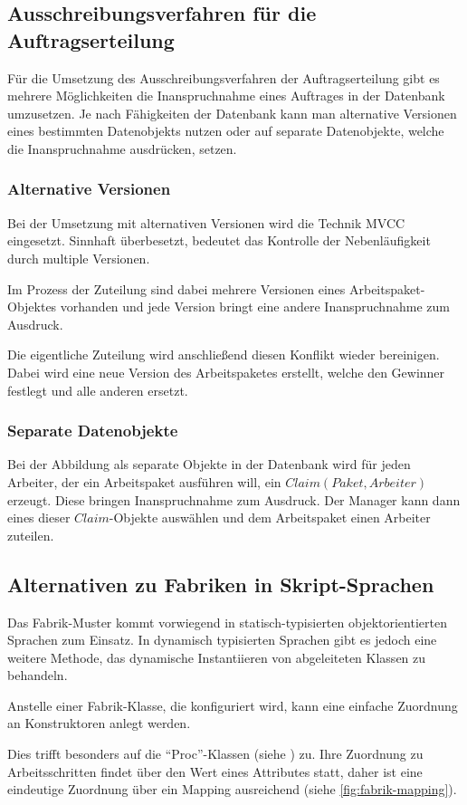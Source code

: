 \subsection{Ausschreibungsverfahren für die Auftragserteilung}
\label{sec:verfahren:erteilung}

Für die Umsetzung des Ausschreibungsverfahren der Auftragserteilung gibt es
mehrere Möglichkeiten die Inanspruchnahme eines Auftrages in
der Datenbank umzusetzen. Je nach Fähigkeiten der Datenbank kann man 
alternative Versionen eines bestimmten Datenobjekts nutzen
oder auf separate Datenobjekte, welche die Inanspruchnahme ausdrücken, setzen.

\subsubsection{Alternative Versionen}

Bei der Umsetzung mit alternativen Versionen wird die Technik \ac{MVCC} eingesetzt.
Sinnhaft überbesetzt, bedeutet das Kontrolle der Nebenläufigkeit durch multiple Versionen.

Im Prozess der Zuteilung sind dabei mehrere Versionen eines Arbeitspaket-Objektes vorhanden und jede Version bringt eine andere Inanspruchnahme zum Ausdruck.

Die eigentliche Zuteilung wird anschließend diesen Konflikt wieder bereinigen.
Dabei wird eine neue Version des Arbeitspaketes erstellt, welche den Gewinner festlegt und alle anderen ersetzt.

\subsubsection{Separate Datenobjekte}

Bei der Abbildung als separate Objekte in der Datenbank
wird für jeden Arbeiter, der ein Arbeitspaket ausführen will, ein $Claim (Paket, Arbeiter)$ erzeugt. Diese bringen Inanspruchnahme zum Ausdruck.
Der Manager kann dann eines dieser $Claim$-Objekte auswählen und dem Arbeitspaket einen Arbeiter zuteilen.

\subsection{Alternativen zu Fabriken in Skript-Sprachen}

Das Fabrik-Muster kommt vorwiegend in statisch-typisierten objektorientierten Sprachen zum Einsatz. In dynamisch typisierten Sprachen gibt es jedoch eine weitere Methode, das dynamische Instantiieren von abgeleiteten Klassen zu behandeln.

Anstelle einer Fabrik-Klasse, die konfiguriert wird,
kann eine einfache Zuordnung an Konstruktoren anlegt werden.

Dies trifft besonders auf die ``Proc''-Klassen (siehe ) zu.
Ihre Zuordnung zu Arbeitsschritten findet über den Wert eines Attributes statt,
daher ist eine eindeutige Zuordnung über ein Mapping ausreichend (siehe \cref{fig:fabrik-mapping}).

